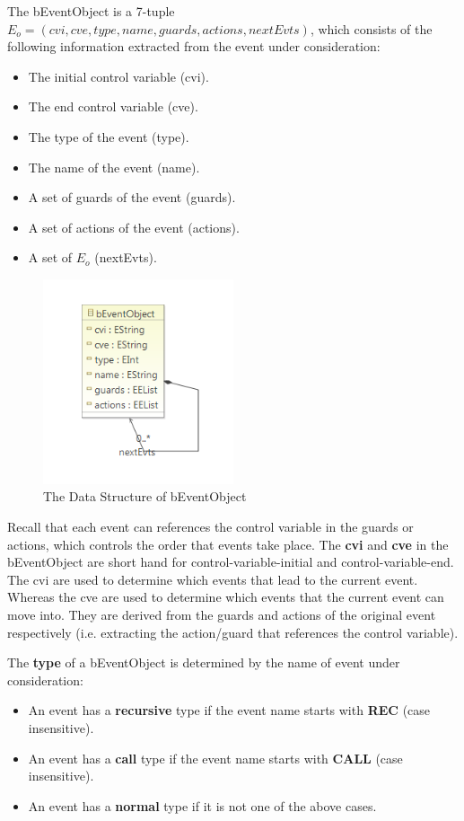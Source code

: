 \documentclass{easychair}
\begin{document}
The bEventObject is a 7-tuple $E_o = (cvi, cve, type, name, guards, actions, nextEvts)$, which consists of the following information extracted from the event under consideration:
\begin{itemize}
	\item The initial control variable (cvi).
	\item The end control variable (cve).
	\item The type of the event (type).
	\item The name of the event (name).
	\item A set of guards of the event (guards).
	\item A set of actions of the event (actions).
	\item A set of $E_o$ (nextEvts). 
\end{itemize}

\begin{figure}[!h]
  \centering
    \includegraphics[width=0.5\textwidth]{img/ebo.PNG}
  \caption{The Data Structure of bEventObject}
  \label{fig:ebo}
\end{figure}

Recall that each event can references the control variable in the guards or actions, which controls the order that events take place. The \textbf{cvi} and \textbf{cve} in the bEventObject are short hand for control-variable-initial and control-variable-end. The cvi are used to determine which events that lead to the current event. Whereas the cve are used to determine which events that the current event can move into. They are derived from the guards and actions of the original event respectively (i.e. extracting the action/guard that references the control variable).

The \textbf{type} of a bEventObject is determined by the name of event under consideration:
\begin{itemize}
	\item An event has a \textbf{recursive} type if the event name starts with \textbf{REC} (case insensitive).
	\item An event has a \textbf{call} type if the event name starts with \textbf{CALL} (case insensitive).
	\item An event has a \textbf{normal} type if it is not one of the above cases.
\end{itemize}
\end{document}
